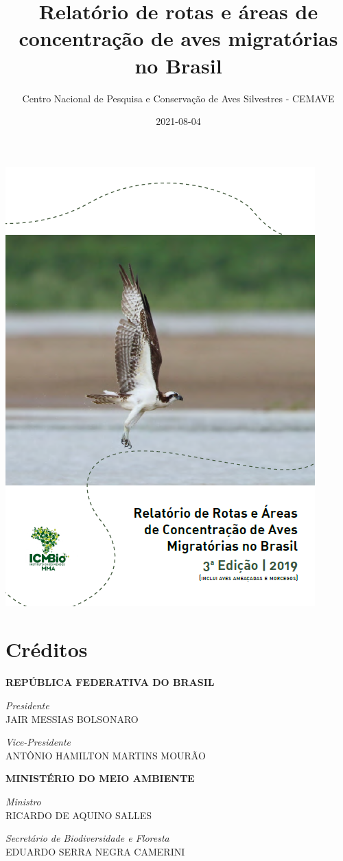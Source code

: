 \documentclass[
]{scrbook}
\title{Relatório de rotas e áreas de concentração de aves migratórias no Brasil}
\author{Centro Nacional de Pesquisa e Conservação de Aves Silvestres - CEMAVE}
\date{2021-08-04}
\begin{document}
\maketitle

{
\setcounter{tocdepth}{1}
\tableofcontents
}
\begin{center}\includegraphics[width=0.75\linewidth]{imagens/capa} \end{center}

\hypertarget{creditos}{%
\chapter*{Créditos}\label{creditos}}

\textbf{REPÚBLICA FEDERATIVA DO BRASIL}

\emph{Presidente}\\
JAIR MESSIAS BOLSONARO

\emph{Vice-Presidente}\\
ANTÔNIO HAMILTON MARTINS MOURÃO

\textbf{MINISTÉRIO DO MEIO AMBIENTE}

\emph{Ministro}\\
RICARDO DE AQUINO SALLES

\emph{Secretário de Biodiversidade e Floresta}\\
EDUARDO SERRA NEGRA CAMERINI
\end{document}
